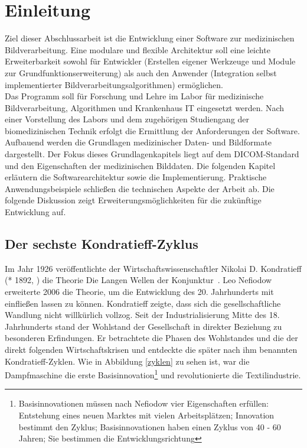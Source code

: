 \chapter{Einleitung}\label{einleitung}

Ziel dieser Abschlussarbeit ist die Entwicklung einer Software zur medizinischen Bildverarbeitung. Eine modulare und flexible Architektur soll eine leichte Erweiterbarkeit sowohl für Entwickler (Erstellen eigener Werkzeuge und Module zur Grundfunktionserweiterung) als auch den Anwender (Integration selbst implementierter Bildverarbeitungsalgorithmen) ermöglichen.\\
Das Programm soll für Forschung und Lehre im Labor für medizinische Bildverarbeitung, Algorithmen und Krankenhaus IT eingesetzt werden. Nach einer Vorstellung des Labors und dem zugehörigen Studiengang der biomedizinischen Technik erfolgt die Ermittlung der Anforderungen der Software. Aufbauend werden die Grundlagen medizinischer Daten- und Bildformate dargestellt. Der Fokus dieses Grundlagenkapitels liegt auf dem DICOM-Standard und den Eigenschaften der medizinischen Bilddaten. Die folgenden Kapitel erläutern die Softwarearchitektur sowie die Implementierung. Praktische Anwendungsbeispiele schließen die technischen Aspekte der Arbeit ab. Die folgende Diskussion zeigt Erweiterungsmöglichkeiten für die zukünftige Entwicklung auf.

\section{Der sechste Kondratieff-Zyklus}
Im Jahr 1926 veröffentlichte der Wirtschaftswissenschaftler Nikolai D. Kondratieff (* 1892, ) die Theorie \glqq Die Langen Wellen der Konjunktur\grqq\ \cite{hensen:gesundeGesellschaft}.
Leo Nefiodow erweiterte 2006 die Theorie, um die Entwicklung des 20. Jahrhunderts mit einfließen lassen zu können. Kondratieff zeigte, dass sich die gesellschaftliche Wandlung nicht willkürlich vollzog. Seit der Industrialisierung Mitte des 18. Jahrhunderts stand der Wohlstand der Gesellschaft in direkter Beziehung zu besonderen Erfindungen. Er betrachtete die Phasen des Wohlstandes und die der direkt folgenden Wirtschaftskrisen und entdeckte die später nach ihm benannten \glqq Kondratieff-Zyklen\grqq.
Wie in Abbildung \ref{zyklen} zu sehen ist, war die Dampfmaschine die erste Basisinnovation\footnote{Basisinnovationen müssen nach Nefiodow vier Eigenschaften erfüllen: Entstehung eines neuen Marktes mit vielen Arbeitsplätzen; Innovation bestimmt den Zyklus; Basisinnovationen haben einen Zyklus von 40 - 60 Jahren; Sie bestimmen die Entwicklungsrichtung} und revolutionierte die Textilindustrie.\cite{wieden:liquidwork}

